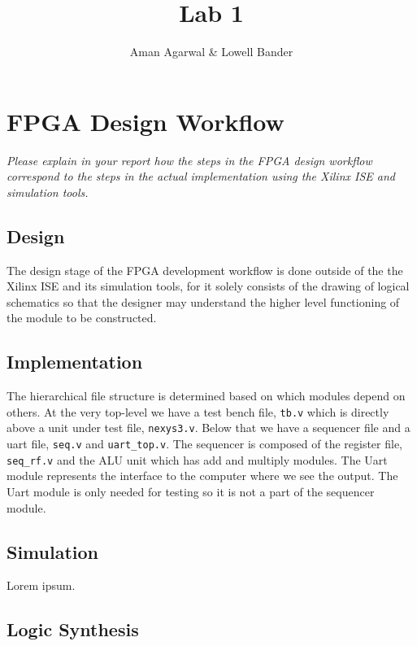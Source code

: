 \documentclass[]{article}
\newcommand{\subtitle}[1]{%
  \posttitle{%
    \par\end{center}
    \begin{center}\large#1\end{center}
    \vskip0.5em}%
}
\begin{document}
\title{Lab 1}
\subtitle{CS M152A}
\author{Aman Agarwal \& Lowell Bander}

\maketitle

\section{FPGA Design Workflow}

\textit{Please explain in your report how the steps in the FPGA design workflow correspond to the steps in the actual implementation using the Xilinx ISE and simulation tools.}\\


\subsection{Design}

The design stage of the FPGA development workflow is done outside of the the Xilinx ISE and its simulation tools, for it solely consists of the drawing of logical schematics so that the designer may understand the higher level functioning of the module to be constructed.

\subsection{Implementation}

The hierarchical file structure is determined based on which modules depend on others. At the very top-level we have a test bench file, \texttt{tb.v} which is directly above a unit under test file, \texttt{nexys3.v}. Below that we have a sequencer file and a uart file, \texttt{seq.v} and \texttt{uart\_top.v}. The sequencer is composed of the register file, \texttt{seq\_rf.v} and the ALU unit which has add and multiply modules. The Uart module represents the interface to the computer where we see the output. The Uart module is only needed for testing so it is not a part of the sequencer module.

\subsection{Simulation}

Lorem ipsum.

\subsection{Logic Synthesis}
\end{document}

